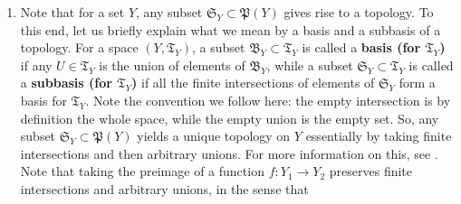 \begin{exa}
\begin{enumerate}
\begin{align*}
      k
      \in
      K
      \text{ such that }
      U
      =
      \mathrm{cov}_{Y}(k)
  \right\rbrace
\end{align*}
Open covers can be ordered.
To this end, we call $\mathrm{cov}_{Y}^{\alpha}$ a \textbf{refinement of $\mathrm{cov}_{Y}$} if for all $k^{\alpha} \in K_{\alpha}$ there is a $k \in K$ such that
\begin{align*}
  \mathrm{cov}_{Y}^{\alpha}
  \left(
    k^{\alpha}
  \right)
  \subset
  \mathrm{cov}_{Y}(k)
\end{align*}
Refinement preorders the set
\begin{align*}
  \mathrm{Cov}_{Y}
  &:=
  \left\lbrace
      \mathbf{Open}_{Y}^{\mathrm{cov}_{Y}}
    \,
    \vert
    \,
      \mathrm{cov}_{Y}
      \text{ is an open cover generator of }
      Y
  \right\rbrace
\end{align*}
by
\begin{align*}
  \mathrm{cov}_{Y}^{\alpha}
  \leq_{\mathrm{Cov}_{Y}}
  \mathrm{cov}_{Y}
  \qquad
  &:\Leftrightarrow
  \qquad
  \mathrm{cov}_{Y}^{\alpha}
  \text{ is a refinement of }
  \mathrm{cov}_{Y}
\end{align*}
One can even show that
\begin{align*}
  \left(
    \mathrm{Cov}_{Y},
    \leq_{\mathrm{Cov}_{Y}}
  \right)
\end{align*}
is a directed set.
See \cite{273ba834} for these particular facts.
\item[$\bullet$]
Note that for a set $Y$, any subset $\mathfrak{S}_{Y} \subset \mathfrak{P}(Y)$ gives rise to a topology.
To this end, let us briefly explain what we mean by a basis and a subbasis of a topology.
For a space $(Y,\mathfrak{T}_{Y})$, a subset $\mathfrak{B}_{Y} \subset \mathfrak{T}_{Y}$ is called a \textbf{basis (for $\mathfrak{T}_{Y}$)} if any $U \in \mathfrak{T}_{Y}$ is the union of elements of $\mathfrak{B}_{Y}$, while a subset $\mathfrak{S}_{Y} \subset \mathfrak{T}_{Y}$ is called a \textbf{subbasis (for $\mathfrak{T}_{Y}$)} if all the finite intersections of elements of $\mathfrak{S}_{Y}$ form a basis for $\mathfrak{T}_{Y}$.
Note the convention we follow here: the empty intersection is by definition the whole space, while the empty union is the empty set.
So, any subset $\mathfrak{S}_{Y} \subset \mathfrak{P}(Y)$ yields a unique topology on $Y$ essentially by taking finite intersections and then arbitrary unions.
For more information on this, see \cite{273ba834}.
Note that taking the preimage of a function $f \colon Y_{1} \rightarrow Y_{2}$ preserves finite intersections and arbitrary unions, in the sense that

\end{enumerate}
\end{exa}
